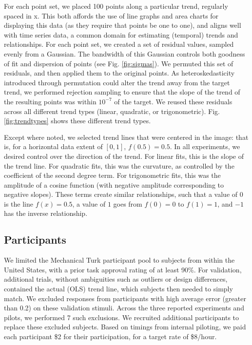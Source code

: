 \documentclass{sigchi}
\begin{document}
For each point set, we placed 100 points along a particular trend, regularly spaced in x. This both affords the use of line graphs and area charts for displaying this data (as they require that points be one to one), and aligns well with time series data, a common domain for estimating (temporal) trends and relationships. For each point set, we created a set of residual values, sampled evenly from a Gaussian. The bandwidth of this Gaussian controls both goodness of fit and dispersion of points (see Fig. \ref{fig:sigmas}). We permuted this set of residuals, and then applied them to the original points. As heteroskedasticity introduced through permutation could alter the trend away from the target trend, we performed rejection sampling to ensure that the slope of the trend of the resulting points was within $10^{-7}$ of the target. We reused these residuals across all different trend types (linear, quadratic, or trigonometric). Fig. \ref{fig:trendtypes} shows these different trend types.

Except where noted, we selected trend lines that were centered in the image: that is, for a horizontal data extent of $[0,1]$, $f(0.5) = 0.5$. In all experiments, we desired control over the direction of the trend. For linear fits, this is the slope of the trend line. For quadratic fits, this was the curvature, as controlled by the coefficient of the second degree term. For trigonometric fits, this was the amplitude of a cosine function (with negative amplitude corresponding to negative slopes). These terms create similar relationships, such that a value of $0$ is the line $f(x)=0.5$, a value of $1$ goes from $f(0)=0$ to $f(1)=1$, and $-1$ has the inverse relationship.

\subsection{Participants}

We limited the Mechanical Turk participant pool to subjects from within the United States, with a prior task approval rating of at least 90\%. For validation, additional trials, without ambiguities such as outliers or design differences, contained the actual (OLS) trend line, which subjects then needed to simply match.  We excluded responses from participants with high average error (greater than 0.2) on these validation stimuli. Across the three reported experiments and pilots, we performed 7 such exclusions. We recruited additional participants to replace these excluded subjects. Based on timings from internal piloting, we paid each participant \$2 for their participation, for a target rate of \$8/hour.
\end{document}

